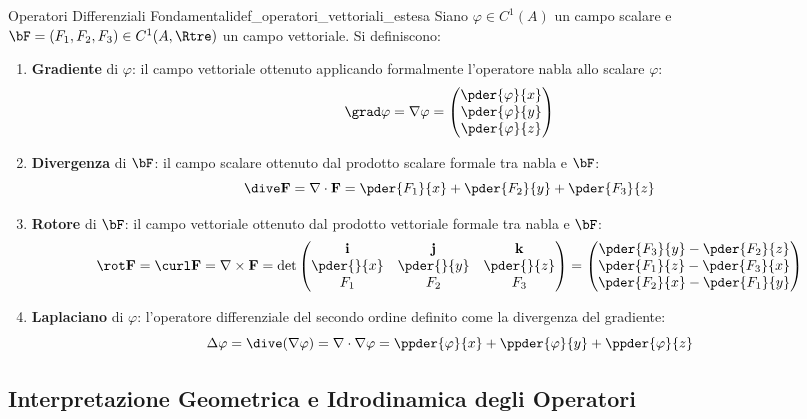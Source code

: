 \begin{definizione}{Operatori Differenziali Fondamentali}{def_operatori_vettoriali_estesa}
Siano $\varphi \in C^1(A)$ un campo scalare e $\bF = (F_1, F_2, F_3) \in C^1(A, \Rtre)$ un campo vettoriale. Si definiscono:
\begin{enumerate}
    \item \textbf{Gradiente} di $\varphi$: il campo vettoriale ottenuto applicando formalmente l'operatore nabla allo scalare $\varphi$:
    \[
    \grad \varphi = \nabla \varphi = \begin{pmatrix} \pder{\varphi}{x} \\ \pder{\varphi}{y} \\ \pder{\varphi}{z} \end{pmatrix}
    \]
    \item \textbf{Divergenza} di $\bF$: il campo scalare ottenuto dal prodotto scalare formale tra nabla e $\bF$:
    \[
    \dive \mathbf{F} = \nabla \cdot \mathbf{F} = \pder{F_1}{x} + \pder{F_2}{y} + \pder{F_3}{z}
    \]
    \item \textbf{Rotore} di $\bF$: il campo vettoriale ottenuto dal prodotto vettoriale formale tra nabla e $\bF$:
    \[
    \rot \mathbf{F} = \curl \mathbf{F} = \nabla \times \mathbf{F} = \det \begin{pmatrix} \mathbf{i} & \mathbf{j} & \mathbf{k} \\ \pder{}{x} & \pder{}{y} & \pder{}{z} \\ F_1 & F_2 & F_3 \end{pmatrix} = \begin{pmatrix} \pder{F_3}{y} - \pder{F_2}{z} \\ \pder{F_1}{z} - \pder{F_3}{x} \\ \pder{F_2}{x} - \pder{F_1}{y} \end{pmatrix}
    \]
    \item \textbf{Laplaciano} di $\varphi$: l'operatore differenziale del secondo ordine definito come la divergenza del gradiente:
    \[
    \Delta \varphi = \dive(\nabla \varphi) = \nabla \cdot \nabla \varphi = \ppder{\varphi}{x} + \ppder{\varphi}{y} + \ppder{\varphi}{z}
    \]
\end{enumerate}
\end{definizione}

\subsection{Interpretazione Geometrica e Idrodinamica degli Operatori}


